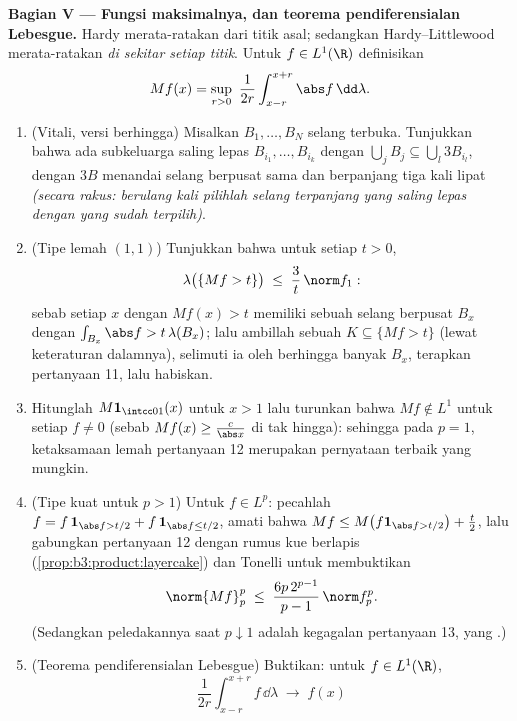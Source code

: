\begin{problem}
\medskip
\noindent\textbf{Bagian V --- Fungsi maksimalnya, dan
teorema pendiferensialan Lebesgue.} Hardy merata-ratakan dari
titik asal; sedangkan Hardy--Littlewood merata-ratakan \emph{di sekitar setiap titik}.
Untuk $f \in L^1(\R)$ definisikan
\[
Mf(x) = \sup_{r>0}\ \frac1{2r}\int_{x-r}^{x+r}\abs
f\,\dd\lambda .
\]
\begin{enumerate}[resume]
  \item (Vitali, versi berhingga) Misalkan $B_1, \dots, B_N$
        selang terbuka. Tunjukkan bahwa ada subkeluarga saling lepas
        $B_{i_1}, \dots, B_{i_k}$ dengan $\bigcup_jB_j
        \subseteq \bigcup_l3B_{i_l}$, dengan $3B$ menandai
        selang berpusat sama dan berpanjang tiga kali lipat
        \emph{(secara rakus: berulang kali pilihlah selang terpanjang
        yang saling lepas dengan yang sudah terpilih)}.
  \item (Tipe lemah $(1,1)$) Tunjukkan bahwa untuk setiap $t > 0$,
        \[
        \lambda\bigl(\{Mf > t\}\bigr) \;\leq\;
        \frac3t\,\norm f_1 :
        \]
        sebab setiap $x$ dengan $Mf(x) > t$ memiliki sebuah selang berpusat
        $B_x$ dengan $\int_{B_x}\abs f > t\,\lambda(B_x)$; lalu ambillah
        sebuah  $K \subseteq \{Mf > t\}$ (lewat keteraturan dalamnya),
        selimuti ia oleh berhingga banyak $B_x$, terapkan pertanyaan 11,
        lalu habiskan.
  \item Hitunglah $M\mathbf 1_{\intcc01}(x)$ untuk $x > 1$ lalu
        turunkan bahwa $Mf \notin L^1$ untuk setiap $f \neq 0$
        (sebab $Mf(x) \geq \frac c{\abs x}$ di tak hingga): sehingga pada $p =
        1$, ketaksamaan lemah pertanyaan 12 merupakan pernyataan terbaik
        yang mungkin.
  \item (Tipe kuat untuk $p > 1$) Untuk $f \in L^p$: pecahlah $f =
        f\,\mathbf 1_{\abs f > t/2} + f\,\mathbf 1_{\abs f
        \leq t/2}$, amati bahwa $Mf \leq M\bigl(f\mathbf 1_{\abs
        f > t/2}\bigr) + \frac t2$, lalu gabungkan pertanyaan 12
        dengan rumus kue berlapis
        (\cref{prop:b3:product:layercake}) dan Tonelli untuk
        membuktikan
        \[
        \norm{Mf}_p^p \;\leq\;
        \frac{6p\,2^{p-1}}{p-1}\,\norm f_p^p .
        \]
        (Sedangkan peledakannya saat $p \downarrow 1$ adalah kegagalan pertanyaan
        13, yang .)
  \item (Teorema pendiferensialan Lebesgue) Buktikan: untuk $f \in
        L^1(\R)$,
        \[
        \frac1{2r}\int_{x-r}^{x+r}f\,\dd\lambda
        \;\longrightarrow\; f(x)
\]
\end{enumerate}
\end{problem}
